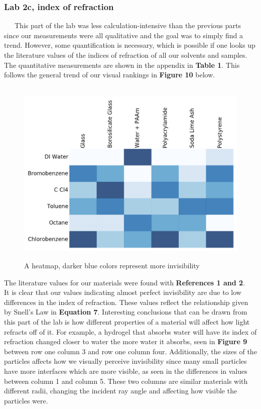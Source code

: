 \documentclass{article}
\begin{document}
\subsubsection*{Lab 2c, index of refraction}
\ \ \ This part of the lab was less calculation-intensive than the previous parts since our measurements were all qualitative and the goal was to simply find a trend. However, some quantification is necessary, which is possible if one looks up the literature values of the indices of refraction of all our solvents and samples. The quantitative measurements are shown in the appendix in \textbf{Table 1}. This follows the general trend of our visual rankings in \textbf{Figure 10} below.

\begin{figure}[h!]
\ \ \ \ \ \ \ \ \ \ \ \ \ \ \ \ \ \ \ \ \ \ \includegraphics[scale=0.35]{boi.png}
	\caption{A heatmap, darker blue colors represent more invisibility}
\end{figure}

The literature values for our materials were found with \textbf{References 1 and 2}.\\

It is clear that our values indicating almost perfect invisibility are due to  low differences in the index of refraction. These values reflect the relationship given by Snell's Law in \textbf{Equation 7}. Interesting conclusions that can be drawn from this part of the lab is how different properties of a material will affect how light refracts off of it. For example, a hydrogel that absorbs water will have its index of refraction changed closer to water the more water it absorbs, seen in \textbf{Figure 9} between row one column 3 and row one column four. Additionally, the sizes of the particles affects how we visually perceive invisibility since many small particles have more interfaces which are more visible, as seen in the differences in values between column 1 and column 5. These two columns are similar materials with different radii, changing the incident ray angle and affecting how visible the particles were.\\
\end{document}
